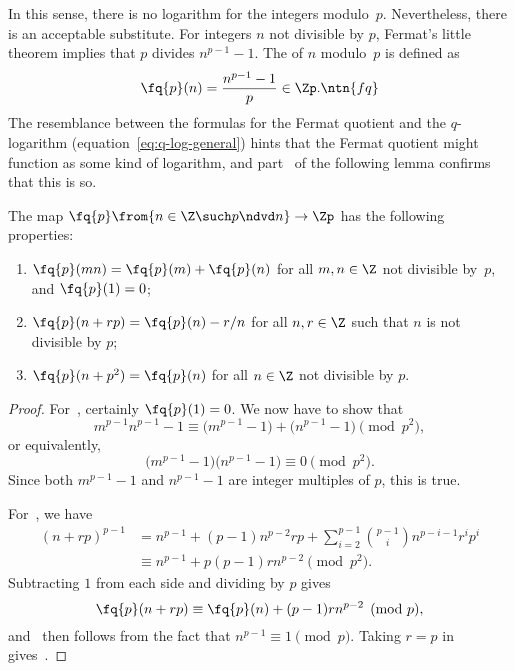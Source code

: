 In this sense, there is no logarithm for the integers modulo~$p$.
Nevertheless, there is an acceptable substitute.  For integers $n$ not
divisible by $p$, Fermat's little theorem implies that $p$ divides $n^{p -
  1} - 1$.  The  of $n$ modulo~$p$ is defined as   
\[
\fq{p}(n) = \frac{n^{p - 1} - 1}{p} \in \Zp.
\ntn{fq}
\]
The resemblance between the formulas for the Fermat quotient and the
$q$-logarithm (equation~\eqref{eq:q-log-general}) hints that the
Fermat quotient might function as some kind of logarithm, and
part~ of the following lemma confirms that this is
so.

\begin{lemma}
The map $\fq{p} \from \{ n \in \Z \such p \ndvd n \} \to \Zp$ has the
following properties:
% 
\begin{enumerate}
\item 
{} 
$\fq{p}(mn) = \fq{p}(m) + \fq{p}(n)$ for all $m, n \in
\Z$ not divisible by~$p$, and $\fq{p}(1) = 0$;

\item
{}
$\fq{p}(n + rp) = \fq{p}(n) - r/n$ for all $n, r \in \Z$ such that $n$ is not
divisible by $p$;

\item
{}
$\fq{p}(n + p^2) = \fq{p}(n)$ for all $n \in \Z$ not divisible by $p$.
% 
\end{enumerate}
\end{lemma}

\begin{proof}
For~, certainly $\fq{p}(1) = 0$.  We now have to
show that
\[
m^{p - 1}n^{p - 1} - 1 
\equiv
\bigl( m^{p - 1} - 1 \bigr) + \bigl( n^{p - 1} - 1 \bigr)
\pmod{p^2},
\]
or equivalently,
\[
\bigl( m^{p - 1} - 1 \bigr)\bigl( n^{p - 1} - 1 \bigr)
\equiv
0
\pmod{p^2}.
\]
Since both $m^{p - 1} - 1$ and $n^{p - 1} - 1$ are integer multiples of
$p$, this is true.

For~, we have
% 
\begin{align*}
(n + rp)^{p - 1}        &
=
n^{p - 1} + (p - 1)n^{p - 2}rp
+ \sum_{i = 2}^{p - 1} \binom{p - 1}{i} n^{p - i - 1} r^i p^i       \\
&
\equiv
n^{p - 1} + p(p - 1)r n^{p - 2}
\pmod{p^2}.
\end{align*}
% 
Subtracting $1$ from each side and dividing by $p$ gives 
\[
\fq{p}(n + rp)
\equiv
\fq{p}(n) + (p - 1)rn^{p - 2}
\pmod{p},
\]
and~ then follows from the fact that $n^{p - 1}
\equiv 1 \pmod{p}$.  Taking $r = p$ in~
gives~. 
\end{proof}

